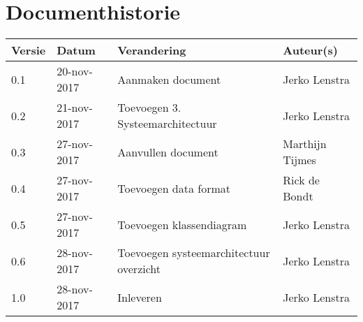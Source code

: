 \section{Documenthistorie}

\begin{tabularx}{\textwidth}{| l | l | X | l |}
	\hline
	\textbf{Versie} & \textbf{Datum} & \textbf{Verandering} & \textbf{Auteur(s)} \\ \hline
	0.1	& 20-nov-2017 & Aanmaken document & Jerko Lenstra \\ \hline
    0.2 & 21-nov-2017 & Toevoegen 3. Systeemarchitectuur & Jerko Lenstra \\ \hline
    0.3 & 27-nov-2017 & Aanvullen document & Marthijn Tijmes \\ \hline
    0.4 & 27-nov-2017 & Toevoegen data format & Rick de Bondt \\ \hline
    0.5 & 27-nov-2017 & Toevoegen klassendiagram & Jerko Lenstra \\ \hline
    0.6 & 28-nov-2017 & Toevoegen systeemarchitectuur overzicht & Jerko Lenstra \\ \hline
    1.0 & 28-nov-2017 & Inleveren & Jerko Lenstra \\ \hline

\end{tabularx}

